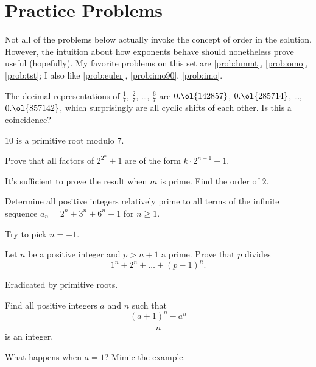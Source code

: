 \documentclass[11pt]{scrartcl}
\begin{document}
\section{Practice Problems}
Not all of the problems below actually invoke the concept of order in the solution.
However, the intuition about how exponents behave should nonetheless prove useful (hopefully).
My favorite problems on this set are \ref{prob:hmmt}, \ref{prob:omo}, \ref{prob:tst};
I also like \ref{prob:euler}, \ref{prob:imo90}, \ref{prob:imo}.

\begin{problem}
  The decimal representations of $\frac17$, $\frac27$, \dots, $\frac67$ are
  $0.\ol{142857}$, $0.\ol{285714}$, \dots, $0.\ol{857142}$, which surprisingly are
  all cyclic shifts of each other.
  Is this a coincidence?
  \begin{hint}
    $10$ is a primitive root modulo $7$.
  \end{hint}
\end{problem}

\begin{problem}
  [Euler]
  \label{prob:euler}
  Prove that all factors of $2^{2^n}+1$ are of the form $k \cdot 2^{n+1}+1$.
  \begin{hint}
    It's sufficient to prove the result when $m$ is prime.
    Find the order of $2$.
  \end{hint}
\end{problem}

\begin{problem}
  [IMO 2005/4]
  Determine all positive integers relatively prime to all terms of the infinite
  sequence $a_n = 2^n+3^n+6^n-1$ for $n \ge 1$.
  \begin{hint}
    Try to pick $n=-1$.
  \end{hint}
\end{problem}

\begin{problem}
  Let $n$ be a positive integer and $p > n+1$ a prime.
  Prove that $p$ divides
  \[ 1^n+2^n+ \dots + (p-1)^n. \]
  \begin{hint}
    Eradicated by primitive roots.
  \end{hint}
\end{problem}

\begin{problem}
  \label{prob:china}
  Find all positive integers $a$ and $n$ such that
  \[ \frac{(a+1)^n-a^n}{n} \]
  is an integer.
  \begin{hint}
    What happens when $a=1$? Mimic the example.
  \end{hint}
\end{problem}
\end{document}
